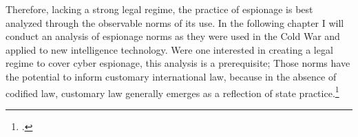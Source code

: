 \documentclass{memoir}
\begin{document}
\begin{refsegment}
Therefore, lacking a strong legal regime, the practice of espionage is best analyzed through the observable norms of its use. In the following chapter I will conduct an analysis of espionage norms as they were used in the Cold War and applied to new intelligence technology. Were one interested in creating a legal regime to cover cyber espionage, this analysis is a prerequisite; Those norms have the potential to inform customary international law, because in the absence of codified law, customary law generally emerges as a reflection of state practice.\footcite[p.~628]{sulmasy_counterintuitive_2007}


\newpage
\printbibliography[heading=subbibliography]

\end{refsegment}
\end{document}
